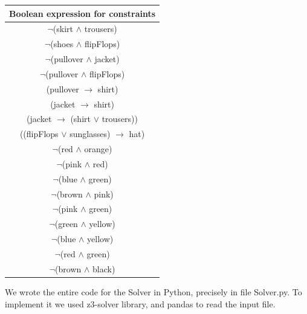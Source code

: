 \documentclass[12pt]{article}
\begin{document}
\begin{center}
\begin{tabular}{|c|}
\hline
Boolean expression for constraints \\[0.1cm]
\hline 
$\neg$(skirt $\wedge$ trousers) \\[0.2cm]
$\neg$(shoes $\wedge$ flipFlops) \\[0.2cm]
$\neg$(pullover $\wedge$ jacket) \\[0.2cm]
$\neg$(pullover $\wedge$ flipFlops) \\[0.2cm]

(pullover $\rightarrow$ shirt) \\[0.2cm]
(jacket $\rightarrow$ shirt) \\[0.2cm]
(jacket $\rightarrow$ (shirt $\lor$ trousers)) \\[0.2cm]
((flipFlops $\lor$ sunglasses)  $\rightarrow$ hat)\\[0.2cm]
$\neg$(red $\wedge$ orange) \\[0.2cm]
$\neg$(pink $\wedge$ red) \\[0.2cm]
$\neg$(blue $\wedge$ green) \\[0.2cm]
$\neg$(brown $\wedge$ pink) \\[0.2cm]
$\neg$(pink $\wedge$ green) \\[0.2cm]
$\neg$(green $\wedge$ yellow) \\[0.2cm]
$\neg$(blue $\wedge$ yellow) \\[0.2cm]
$\neg$(red $\wedge$ green) \\[0.2cm]
$\neg$(brown $\wedge$ black) \\[0.2cm]

\hline
\end{tabular}
\end{center}

We wrote the entire code for the Solver in Python, precisely in file Solver.py. To implement it we used z3-solver library, and pandas to read the input file. 
\end{document}
